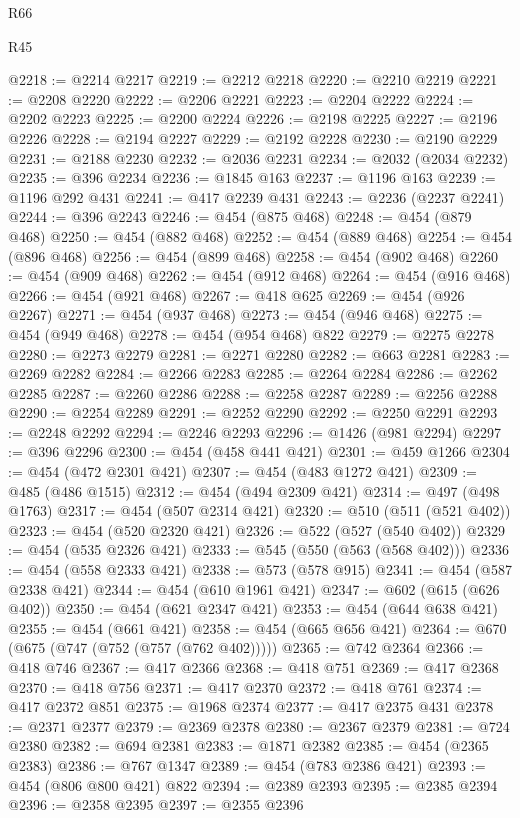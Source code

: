 \begin{lexlean}{R66}
\begin{lexlean}{R45}
\begin{coremodule}
{{{{{{{{{{{{{{{{{{{{{{{{{{{{{{{{{{{{{{{{{{{{{{{{{{{{{{{{{{{{{{{{{{{{{{{{{{{{{{{{{{{{{{{{{{{@2218 := @2214 @2217
@2219 := @2212 @2218
@2220 := @2210 @2219
@2221 := @2208 @2220
@2222 := @2206 @2221
@2223 := @2204 @2222
@2224 := @2202 @2223
@2225 := @2200 @2224
@2226 := @2198 @2225
@2227 := @2196 @2226
@2228 := @2194 @2227
@2229 := @2192 @2228
@2230 := @2190 @2229
@2231 := @2188 @2230
@2232 := @2036 @2231
@2234 := @2032 (@2034 @2232)
@2235 := @396 @2234
@2236 := @1845 @163
@2237 := @1196 @163
@2239 := @1196 @292 @431
@2241 := @417 @2239 @431
@2243 := @2236 (@2237 @2241)
@2244 := @396 @2243
@2246 := @454 (@875 @468)
@2248 := @454 (@879 @468)
@2250 := @454 (@882 @468)
@2252 := @454 (@889 @468)
@2254 := @454 (@896 @468)
@2256 := @454 (@899 @468)
@2258 := @454 (@902 @468)
@2260 := @454 (@909 @468)
@2262 := @454 (@912 @468)
@2264 := @454 (@916 @468)
@2266 := @454 (@921 @468)
@2267 := @418 @625
@2269 := @454 (@926 @2267)
@2271 := @454 (@937 @468)
@2273 := @454 (@946 @468)
@2275 := @454 (@949 @468)
@2278 := @454 (@954 @468) @822
@2279 := @2275 @2278
@2280 := @2273 @2279
@2281 := @2271 @2280
@2282 := @663 @2281
@2283 := @2269 @2282
@2284 := @2266 @2283
@2285 := @2264 @2284
@2286 := @2262 @2285
@2287 := @2260 @2286
@2288 := @2258 @2287
@2289 := @2256 @2288
@2290 := @2254 @2289
@2291 := @2252 @2290
@2292 := @2250 @2291
@2293 := @2248 @2292
@2294 := @2246 @2293
@2296 := @1426 (@981 @2294)
@2297 := @396 @2296
@2300 := @454 (@458 @441 @421)
@2301 := @459 @1266
@2304 := @454 (@472 @2301 @421)
@2307 := @454 (@483 @1272 @421)
@2309 := @485 (@486 @1515)
@2312 := @454 (@494 @2309 @421)
@2314 := @497 (@498 @1763)
@2317 := @454 (@507 @2314 @421)
@2320 := @510 (@511 (@521 @402))
@2323 := @454 (@520 @2320 @421)
@2326 := @522 (@527 (@540 @402))
@2329 := @454 (@535 @2326 @421)
@2333 := @545 (@550 (@563 (@568 @402)))
@2336 := @454 (@558 @2333 @421)
@2338 := @573 (@578 @915)
@2341 := @454 (@587 @2338 @421)
@2344 := @454 (@610 @1961 @421)
@2347 := @602 (@615 (@626 @402))
@2350 := @454 (@621 @2347 @421)
@2353 := @454 (@644 @638 @421)
@2355 := @454 (@661 @421)
@2358 := @454 (@665 @656 @421)
@2364 := @670 (@675 (@747 (@752 (@757 (@762 @402)))))
@2365 := @742 @2364
@2366 := @418 @746
@2367 := @417 @2366
@2368 := @418 @751
@2369 := @417 @2368
@2370 := @418 @756
@2371 := @417 @2370
@2372 := @418 @761
@2374 := @417 @2372 @851
@2375 := @1968 @2374
@2377 := @417 @2375 @431
@2378 := @2371 @2377
@2379 := @2369 @2378
@2380 := @2367 @2379
@2381 := @724 @2380
@2382 := @694 @2381
@2383 := @1871 @2382
@2385 := @454 (@2365 @2383)
@2386 := @767 @1347
@2389 := @454 (@783 @2386 @421)
@2393 := @454 (@806 @800 @421) @822
@2394 := @2389 @2393
@2395 := @2385 @2394
@2396 := @2358 @2395
@2397 := @2355 @2396
}}}}}}}}}}}}}}}}}}}}}}}}}}}}}}}}}}}}}}}}}}}}}}}}}}}}}}}}}}}}}}}}}}}}}}}}}}}}}}}}}}}}}}}}}}}
\end{coremodule}
\end{lexlean}
\end{lexlean}
